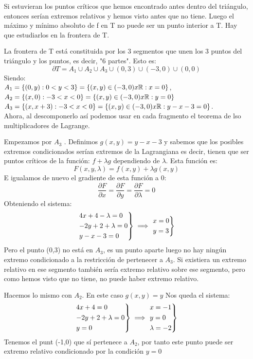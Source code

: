 \begin{ejer}
	Si estuvieran los puntos críticos que hemos encontrado antes dentro del triángulo, entonces serían extremos relativos y hemos visto antes que no tiene. Luego el máximo y mínimo absoluto de f en T no puede ser un punto interior a T. Hay que estudiarlos en la frontera de T.

	La frontera de T está constituida por los 3 segmentos que unen los 3 puntos del triángulo y los puntos, es decir, "6 partes". Esto es:
	\[
	\partial T = A_1 \cup A_2 \cup A_3 \cup (0,3) \cup (-3,0) \cup (0,0)
	\]
	Siendo:\\ $A_1 = \{ (0,y) : 0 < y < 3\}  = \{(x,y) \in (-3,0)x\mathbb{R} : x = 0\}$,\\
	 $A_2 =\{(x,0) :  -3 < x < 0\} = \{(x,y) \in (-3,0)x \mathbb{R} : y = 0\}$  \\
	 $A_3 =\{(x,x+3) :  -3< x < 0\} = \{(x,y)\in (-3,0)x\mathbb{R} :  y -x-3 = 0\}$.\\

	Ahora, al descomponerlo así podemos usar en cada fragmento el teorema de lso multiplicadores de Lagrange.

	Empezamos por $A_3$ . Definimos $g(x,y) = y-x-3$ y sabemos que los posibles extremos condicionados serían extremos de la Lagrangiana es decir, tienen que ser puntos críticos de la función: $f+\lambda g$ dependiendo de $\lambda$.
	Esta función es:
	\[
	F(x,y,\lambda) = f(x,y) + \lambda g(x,y)
	\]
	E igualamos de nuevo el gradiente de esta función a 0:
	\[
	\frac{\partial F}{\partial x} =  \frac{\partial F}{\partial y} =\frac{\partial F}{\partial \lambda} = 0
	\]
	Obteniendo el sistema:
	\[
	\begin{rcases}
	4x +4 - \lambda = 0\\
	-2y +2 + \lambda = 0\\
	 y-x-3 = 0
\end{rcases}\implies  \begin{rcases}
	x = 0\\
	y = 3 \\
\end{rcases}
	\]
	Pero el punto (0,3) no está en $A_3$, es un punto aparte luego no hay ningún extremo condicionado a la restricción de pertenecer a $A_3$. Si existiera un extremo relativo en ese segmento también sería extremo relativo sobre ese segmento, pero como hemos visto que no tiene, no puede haber extremo relativo.

	Hacemos lo mismo con $A_2$. En este caso $g(x,y) = y$ Nos queda el sistema:
	\[
	\begin{rcases}
	4x +4  = 0\\
	-2y +2 + \lambda = 0\\
	 y = 0
\end{rcases}\implies \begin{rcases}
	x=-1\\
	y = 0\\
	\lambda = -2
\end{rcases}
	\]
	Tenemos el punt (-1,0) que sí pertenece a $A_2$, por tanto este punto puede ser extremo relativo condicionado por la condición $y = 0$


\end{ejer}
